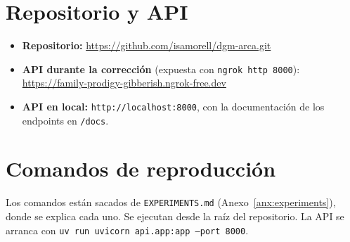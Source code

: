 \section{Repositorio y API}
\begin{itemize}
    \item \textbf{Repositorio:} \url{https://github.com/isamorell/dgm-arca.git}
    \item \textbf{API durante la corrección} (expuesta con \texttt{ngrok http 8000}):\\
    \url{https://family-prodigy-gibberish.ngrok-free.dev}
    \item \textbf{API en local:} \texttt{http://localhost:8000}, con la documentación de los endpoints en \texttt{/docs}.
\end{itemize}

\section{Comandos de reproducción}
Los comandos están sacados de \texttt{EXPERIMENTS.md} (Anexo~\ref{anx:experiments}), donde se explica cada uno. Se ejecutan desde la raíz del repositorio. La API se arranca con \texttt{uv run uvicorn api.app:app --port 8000}.

